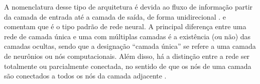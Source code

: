 \documentclass{automatextcc}
\begin{document}





A nomenclatura desse tipo de arquitetura é devida ao fluxo de informação partir da camada de entrada até a camada de saída, de forma unidirecional \citep{goodfellow2016}. \citet{hastie2009} e \citet{fan2021} comentam que é o tipo padrão de rede neural. A principal diferença entre uma rede de camada única e uma com múltiplas camadas é a existência (ou não) das camadas ocultas, sendo que a designação ``camada única'' se refere a uma camada de neurônios ou nós computacionais. Além disso, há a distinção entre a rede ser totalmente ou parcialmente conectada, no sentido de que os nós de uma camada são conectados a todos os nós da camada adjacente \citep{haykin2001}. 
\end{document}
